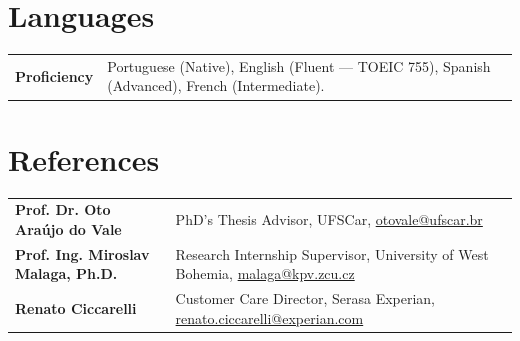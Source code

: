 \documentclass[a4paper]{article}
\begin{document}
\section{Languages}
\begin{tabularx}{\linewidth}{@{}l X@{}}
\textbf{Proficiency} & Portuguese (Native), English (Fluent --- TOEIC 755), Spanish (Advanced), French (Intermediate).\\
\end{tabularx}

\section{References}
\begin{tabularx}{\linewidth}{@{}l X@{}}
\textbf{Prof. Dr. Oto Araújo do Vale} & \normalsize{PhD's Thesis Advisor, UFSCar, \href{mailto:otovale@ufscar.br}{otovale@ufscar.br}}  \\
\textbf{Prof. Ing. Miroslav Malaga, Ph.D.} & \normalsize{Research Internship Supervisor, University of West Bohemia, \href{mailto:malaga@kpv.zcu.cz}{malaga@kpv.zcu.cz}} \\
\textbf{Renato Ciccarelli} & \normalsize{Customer Care Director, Serasa Experian, \href{mailto:renato.ciccarelli@experian.com}{renato.ciccarelli@experian.com}} \\
\end{tabularx}

\vfill
\end{document}
